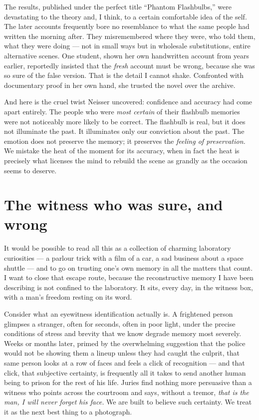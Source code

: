 The results, published under the perfect title ``Phantom Flashbulbs,'' were devastating to the theory and, I think, to a certain comfortable idea of the self. The later accounts frequently bore no resemblance to what the same people had written the morning after. They misremembered where they were, who told them, what they were doing — not in small ways but in wholesale substitutions, entire alternative scenes. One student, shown her own handwritten account from years earlier, reportedly insisted that the \emph{fresh} account must be wrong, because she was so sure of the false version. That is the detail I cannot shake. Confronted with documentary proof in her own hand, she trusted the novel over the archive.

And here is the cruel twist Neisser uncovered: confidence and accuracy had come apart entirely. The people who were \emph{most certain} of their flashbulb memories were not noticeably more likely to be correct. The flashbulb is real, but it does not illuminate the past. It illuminates only our conviction about the past. The emotion does not preserve the memory; it preserves the \emph{feeling of preservation.} We mistake the heat of the moment for its accuracy, when in fact the heat is precisely what licenses the mind to rebuild the scene as grandly as the occasion seems to deserve.

\section*{The witness who was sure, and wrong}

It would be possible to read all this as a collection of charming laboratory curiosities — a parlour trick with a film of a car, a sad business about a space shuttle — and to go on trusting one's own memory in all the matters that count. I want to close that escape route, because the reconstructive memory I have been describing is not confined to the laboratory. It sits, every day, in the witness box, with a man's freedom resting on its word.

Consider what an eyewitness identification actually is. A frightened person glimpses a stranger, often for seconds, often in poor light, under the precise conditions of stress and brevity that we know degrade memory most severely. Weeks or months later, primed by the overwhelming suggestion that the police would not be showing them a lineup unless they had caught the culprit, that same person looks at a row of faces and feels a click of recognition — and that click, that subjective certainty, is frequently all it takes to send another human being to prison for the rest of his life. Juries find nothing more persuasive than a witness who points across the courtroom and says, without a tremor, \emph{that is the man, I will never forget his face.} We are built to believe such certainty. We treat it as the next best thing to a photograph.

